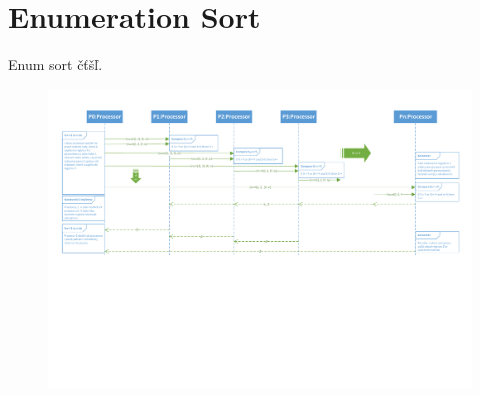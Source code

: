 \documentclass[a4paper,11pt]{article}
\begin{document}
\section{Enumeration Sort}
Enum sort čťšľ.

\begin{figure}[!htb]
\centering
\includegraphics[width=\textwidth]{sequence.pdf}
\end{figure}
\end{document}
